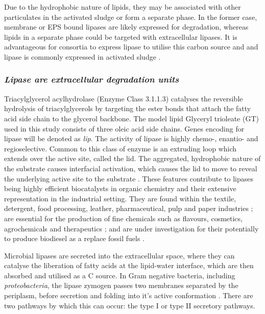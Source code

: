 \documentclass{article}
\begin{document}
Due to the hydrophobic nature of lipids, they may be associated with other particulates in the activated sludge or form a separate phase. In the former case, membrane or EPS bound lipases are likely expressed for degradation, whereas lipids in a separate phase could be targeted with extracellular lipases. It is advantageous for consortia to express lipase to utilise this carbon source and and lipase is commonly expressed in activated sludge \cite{gessesse2003lipase}. 


\subsubsection{\emph{Lipase are extracellular degradation units}}
Triacylglycerol acylhydrolase (Enzyme Class 3.1.1.3) catalyses the reversible hydrolysis of triacylglycerols by targeting the ester bonds that attach the fatty acid side chain to the glycerol backbone. The model lipid Glyceryl trioleate (GT) used in this study consists of three oleic acid side chains. Genes encoding for lipase will be denoted as \emph{lip}.
The activity of lipase is highly chemo-, enantio- and regioselective. Common to this class of enzyme is an extruding loop which extends over the active site, called the lid. The aggregated, hydrophobic nature of the substrate causes interfacial activation, which causes the lid to move to reveal the underlying active site to the substrate \cite{derewenda1992,van_Tilbeurgh1993}. These features contribute to lipases being highly efficient biocatalysts in organic chemistry and their extensive representation in the industrial setting. 
They are found within the textile, detergent, food processing, leather, pharmaceutical, pulp and paper industries \cite{hasan_06}; are essential for the production of fine chemicals such as flavours, cosmetics, agrochemicals and therapeutics \cite{jaeger2002}; and are under investigation for their potentially to produce biodiesel as a replace fossil fuels \cite{hasan_06,iso2001}. 


Microbial lipases are secreted into the extracellular space, where they can catalyse the liberation of fatty acids at the lipid-water interface, which are then absorbed and utilised as a C source. In Gram negative bacteria, including \emph{proteobacteria}, the lipase zymogen passes two membranes separated by the periplasm, before secretion and folding into it's active conformation \cite{bos2007,michel2009}. There are two pathways by which this can occur: the type I or type II secretory pathways. 
\end{document}
